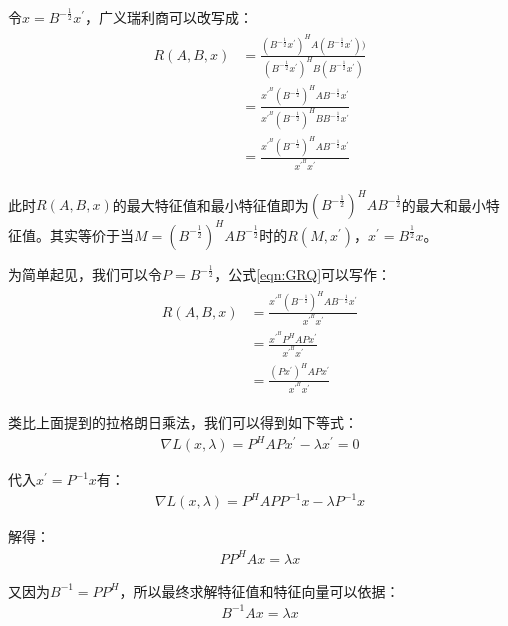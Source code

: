 令$x=B^{-\frac{1}{2}}x^{'}$，广义瑞利商可以改写成：
\begin{align}
\label{eqn:GRQ}
\begin{split}
R(A,B,x) &= \frac{(B^{-\frac{1}{2}}x^{'})^{H}A(B^{-\frac{1}{2}}x^{'}))}{(B^{-\frac{1}{2}}x^{'})^{H}B(B^{-\frac{1}{2}}x^{'})} \\
         &= \frac{x^{'}^{H}(B^{-\frac{1}{2}})^{H}AB^{-\frac{1}{2}}x^{'}}{x^{'}^{H}(B^{-\frac{1}{2}})^{H}BB^{-\frac{1}{2}}x^{'}}  \\
         &= \frac{x^{'}^{H}(B^{-\frac{1}{2}})^{H}AB^{-\frac{1}{2}}x^{'}}{x^{'}^{H}x^{'}}
\end{split}
\end{align}

此时$R(A,B,x)$的最大特征值和最小特征值即为$(B^{-\frac{1}{2}})^{H}AB^{-\frac{1}{2}}$的最大和最小特征值。其实等价于当$M=(B^{-\frac{1}{2}})^{H}AB^{-\frac{1}{2}}$时的$R(M,x^{'})$，$x^{'}=B^{\frac{1}{2}}x$。

为简单起见，我们可以令$P=B^{-\frac{1}{2}}$，公式\ref{eqn:GRQ}可以写作：
\begin{align}
\label{eqn:GRQ1}
\begin{split}
R(A,B,x) &= \frac{x^{'}^{H}(B^{-\frac{1}{2}})^{H}AB^{-\frac{1}{2}}x^{'}}{x^{'}^{H}x^{'}} \\
         &= \frac{x^{'}^{H}P^{H}APx^{'}}{x^{'}^{H}x^{'}}  \\
         &= \frac{(Px^{'})^{H}APx^{'}}{x^{'}^{H}x^{'}}
\end{split}
\end{align}

类比上面提到的拉格朗日乘法，我们可以得到如下等式：
\begin{align}
\nabla{L(x, \lambda)} = P^{H}APx^{'} - \lambda{x^{'}} = 0
\end{align}

代入$x^{'}=P^{-1}x$有：
\begin{align}
\nabla{L(x, \lambda)} = P^{H}APP^{-1}x - \lambda{P^{-1}x} 
\end{align}

解得：
\begin{align}
PP^{H}Ax=\lambda{x} 
\end{align}

又因为$B^{-1}=PP^{H}$，所以最终求解特征值和特征向量可以依据：
\begin{align}
B^{-1}Ax=\lambda{x}
\end{align}

